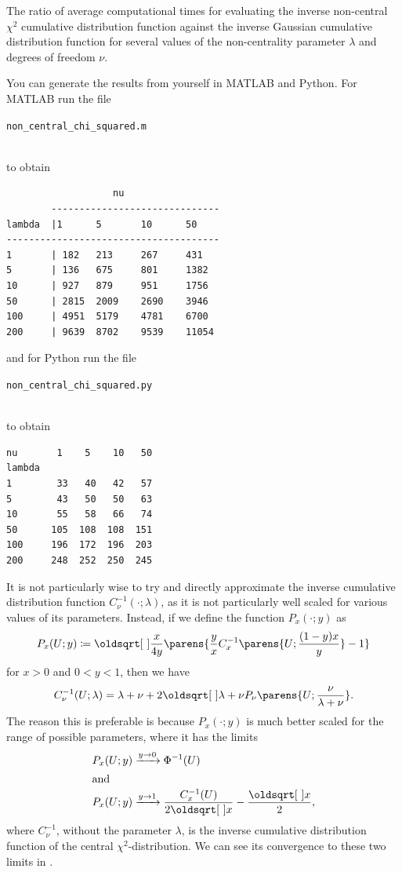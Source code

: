 \documentclass[11pt,a4paper,twoside,english]{extarticle}
\newcommand{\singlecodeline}[1]{\\[1em]\centerline{\lstinline[basicstyle=\ttfamily]$#1$}\\[1em]}
\begin{document}
\begin{table}[htb]
\caption[Computational times for inverse non-central $ \chi^2 $ cumulative distribution]{The ratio of average computational times for evaluating the inverse non-central $ \chi^2 $ cumulative distribution function against the inverse Gaussian cumulative distribution function for several values of the non-centrality parameter $ \lambda $ and degrees of freedom $ \nu $.}
\label{tab:non_central_chi_2_times}
\end{table}

You can generate the results from  yourself in MATLAB and Python. For MATLAB run the file \singlecodeline{non_central_chi_squared.m} to obtain
\begin{verbatim}
	               nu
        ------------------------------
lambda  |1      5       10      50 	
--------------------------------------
1       | 182   213     267     431 	
5       | 136   675     801     1382 	
10      | 927   879     951     1756 	
50      | 2815  2009    2690    3946 	
100     | 4951  5179    4781    6700 	
200     | 9639  8702    9539    11054 	
\end{verbatim} 
and for Python run the file \singlecodeline{non_central_chi_squared.py} to obtain
\begin{verbatim}
nu       1    5    10   50
lambda                    
1        33   40   42   57
5        43   50   50   63
10       55   58   66   74
50      105  108  108  151
100     196  172  196  203
200     248  252  250  245
\end{verbatim}


It is not particularly wise to try and directly approximate the inverse cumulative distribution function $ C^{-1}_{\nu}(\cdot;\lambda) $, as it is not particularly well scaled for various values of its parameters. Instead, if we define the function $ P_x(\cdot;y) $ as 
\begin{equation}
P_x(U;y) \coloneqq \sqrt{\dfrac{x}{4y}}\parens{ \dfrac{y}{x}  C^{-1}_{x}\parens{U; \dfrac{(1 - y)x}{y}} - 1}
\end{equation}
for $ x > 0 $ and $ 0 < y < 1  $, then we have 
\begin{equation}
C^{-1}_{\nu}(U;\lambda) = \lambda + \nu + 2 \sqrt{\lambda + \nu} P_\nu\parens{U;\dfrac{\nu}{\lambda + \nu}}.
\end{equation}
The reason this is preferable is because $ P_x(\cdot;y) $ is much better scaled for the range of possible parameters, where it has the limits
\begin{align}
P_x(U;y) & \xrightarrow{y\to 0} \Phi^{-1}(U) \\
\shortintertext{and}
P_x(U;y) & \xrightarrow{y\to 1} \dfrac{C^{-1}_x(U)}{2\sqrt{x}} - \dfrac{\sqrt{x}}{2},
\end{align}
where $ C^{-1}_\nu $, without the parameter $ \lambda $, is the inverse cumulative distribution function of the central $ \chi^2 $-distribution. We can see its convergence to these two limits in .
\end{document}
